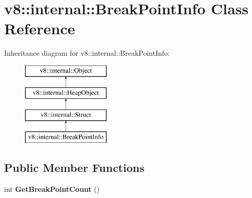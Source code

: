 \hypertarget{classv8_1_1internal_1_1_break_point_info}{}\section{v8\+:\+:internal\+:\+:Break\+Point\+Info Class Reference}
\label{classv8_1_1internal_1_1_break_point_info}
Inheritance diagram for v8\+:\+:internal\+:\+:Break\+Point\+Info\+:\begin{figure}[H]
\begin{center}
\leavevmode
\includegraphics[height=4.000000cm]{classv8_1_1internal_1_1_break_point_info}
\end{center}
\end{figure}
\subsection*{Public Member Functions}
\begin{DoxyCompactItemize}
\item 
int {\bfseries Get\+Break\+Point\+Count} ()\hypertarget{classv8_1_1internal_1_1_break_point_info_afef5eea1b97cdc1c1a52ecbabc22e900}{}\label{classv8_1_1internal_1_1_break_point_info_afef5eea1b97cdc1c1a52ecbabc22e900}

\end{DoxyCompactItemize}
